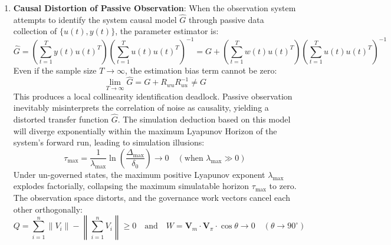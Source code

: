 \documentclass[11pt,a4paper]{article}
\begin{document}
\begin{enumerate}
    \item \textbf{Causal Distortion of Passive Observation}:
    When the observation system attempts to identify the system causal model $\hat{G}$ through passive data collection of $\{u(t), y(t)\}$, the parameter estimator is:
    \begin{equation}
        \hat{G} = \left(\sum_{t=1}^T y(t) u(t)^T \right) \left(\sum_{t=1}^T u(t) u(t)^T \right)^{-1} = G + \left(\sum_{t=1}^T w(t) u(t)^T \right) \left(\sum_{t=1}^T u(t) u(t)^T \right)^{-1}
    \end{equation}
    Even if the sample size $T \to \infty$, the estimation bias term cannot be zero:
    \begin{equation}
        \lim_{T \to \infty} \hat{G} = G + R_{wu} R_{uu}^{-1} \neq G
    \end{equation}
    This produces a local collinearity identification deadlock. Passive observation inevitably misinterprets the correlation of noise as causality, yielding a distorted transfer function $\hat{G}$. The simulation deduction based on this model will diverge exponentially within the maximum Lyapunov Horizon of the system's forward run, leading to simulation illusions:
    \begin{equation}\label{lyapunov-horizon}
        \tau_{\text{max}} = \frac{1}{\lambda_{\text{max}}} \ln \left( \frac{\Delta_{\text{max}}}{\delta_0} \right) \to 0 \quad (\text{when } \lambda_{\text{max}} \gg 0)
    \end{equation}
    Under un-governed states, the maximum positive Lyapunov exponent $\lambda_{\text{max}}$ explodes factorially, collapsing the maximum simulatable horizon $\tau_{\text{max}}$ to zero. The observation space distorts, and the governance work vectors cancel each other orthogonally:
    \begin{equation}
        Q = \sum_{i=1}^{n} \|V_i\| - \left\| \sum_{i=1}^{n} V_i \right\| \ge 0 \quad \text{and} \quad W = \mathbf{V}_m \cdot \mathbf{V}_{\pi} \cdot \cos\theta \to 0 \quad (\theta \to 90^\circ)
    \end{equation}


\end{enumerate}
\end{document}
